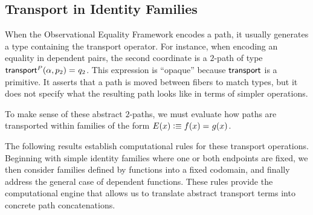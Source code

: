 \subsection*{Transport in Identity Families}

When the Observational Equality Framework encodes a path, it usually generates a type containing the transport operator. For instance, when encoding an equality in dependent pairs, the second coordinate is a $2$-path of type $\mathsf{transport}^P(\alpha,p_2)\mathrel{=_{}} q_2$. This expression is ``opaque'' because $\mathsf{transport}$ is a primitive. It asserts that a path is moved between fibers to match types, but it does not specify what the resulting path looks like in terms of simpler operations.

To make sense of these abstract $2$-paths, we must evaluate how paths are transported within families of the form\/ $E(x) \mathrel{\vcentcolon}\equiv f(x) \mathrel{=_{}} g(x)$.

The following results establish computational rules for these transport operations. Beginning with simple identity families where one or both endpoints are fixed, we then consider families defined by functions into a fixed codomain, and finally address the general case of dependent functions. These rules provide the computational engine that allows us to translate abstract transport terms into concrete path concatenations.

